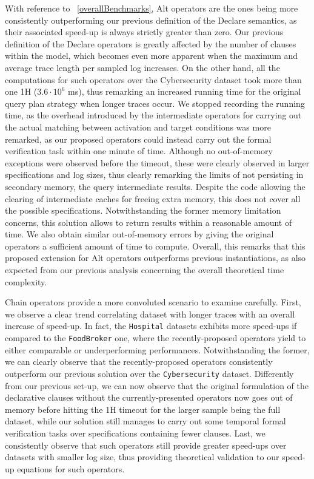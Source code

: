 \documentclass[sigconf]{acmart}
\begin{document}
With reference to \figurename~\ref{overallBenchmarks}, Alt operators are the ones being more consistently outperforming our previous definition of the Declare semantics, as their associated speed-up is always strictly greater than zero. Our previous definition of the Declare operators is greatly affected by the number of clauses within the model, which becomes even more apparent when the maximum and average trace length per sampled log increases. On the other hand, all the computations for such operators over the Cybersecurity dataset took more than one 1H ($3.6\cdot 10^6$ ms), thus remarking an increased running time for the original query plan strategy when longer traces occur. We stopped recording the running time, as the overhead introduced by the intermediate operators for carrying out the actual matching between activation and target conditions was more remarked, as our proposed operators could instead carry out the formal verification task within one minute of time. Although no out-of-memory exceptions were observed before the timeout, these were clearly observed in larger specifications and log sizes, thus clearly remarking the limits of not persisting in secondary memory, the query intermediate results. Despite the code allowing the clearing of intermediate caches for freeing extra memory, this does not cover all the possible specifications. Notwithstanding the former memory limitation concerns, this solution allows to return results within a reasonable amount of time. We also obtain similar out-of-memory errors by giving the original operators a sufficient amount of time to compute. Overall, this remarks that this proposed extension for Alt operators outperforms previous instantiations, as also expected from our previous analysis concerning the overall theoretical time complexity.


Chain operators provide a more convoluted scenario to examine carefully. First, we observe a clear trend correlating dataset with longer traces with an overall increase of speed-up. In fact, the \texttt{Hospital} datasets exhibits more speed-ups if compared to the \texttt{FoodBroker} one, where the recently-proposed operators yield to either comparable or underperforming performances. Notwithstanding the former, we can clearly observe that the recently-proposed operators consistently outperform our previous solution over the \texttt{Cybersecurity} dataset. Differently from our previous set-up, we can now observe that the original formulation of the declarative clauses without the currently-presented operators now goes out of memory before hitting the 1H timeout for the larger sample being the full dataset, while our solution still manages to carry out some temporal formal verification tasks over specifications containing fewer clauses. Last, we consistently observe that such operators still provide greater speed-ups over datasets with smaller log size, thus providing theoretical validation to our speed-up equations for such operators.
\end{document}
